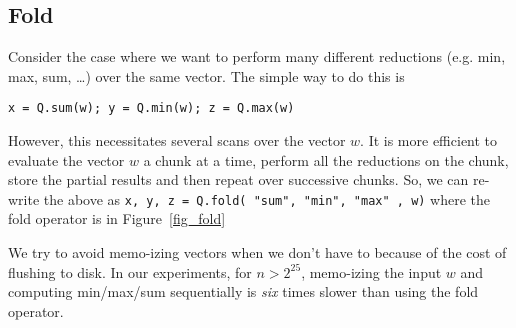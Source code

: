 \subsection{Fold}
\label{fold}
Consider the case where we want to perform many different reductions (e.g. min,
max, sum, \ldots) over the same vector. The simple way to do this is
\begin{verbatim}
x = Q.sum(w); y = Q.min(w); z = Q.max(w)
\end{verbatim}
However, this necessitates several scans over the vector \(w\). It is more
efficient to evaluate the vector \(w\) a chunk at a time, perform all the
reductions on the chunk, store the partial results and then repeat over
successive chunks. So, we can re-write the above as 
{\tt x, y, z = Q.fold({ "sum", "min", "max" }, w)}
where the fold operator is in Figure~\ref{fig_fold}

\begin{figure}
\centering
{}
\end{figure}
We try to avoid memo-izing vectors when we don't have to because 
of the cost of flushing to disk. In our experiments, for \(n > 2^{25}\), 
memo-izing the input \(w\) and computing min/max/sum sequentially 
is {\em six} times slower than using the fold operator.
